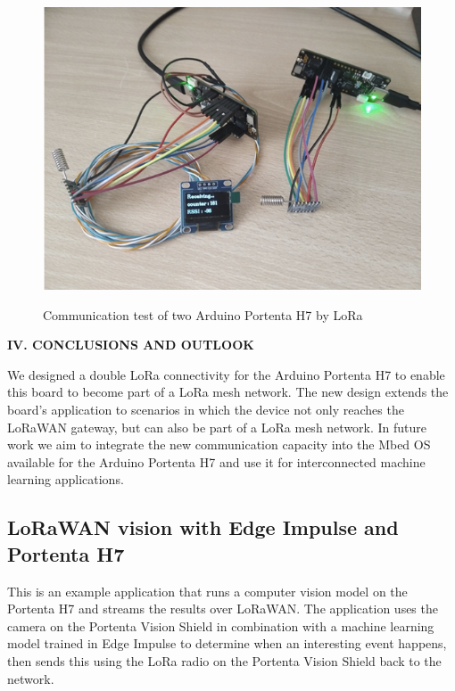 \begin{figure}
	\begin{center}
		\includegraphics[width=0.7\linewidth]{Images/LORA/LCommunication.png}
		\caption{Communication test of two Arduino Portenta H7 by LoRa}
		\label{LCommunication} \cite{PortentaLANMAN2022}
	\end{center}
\end{figure}

\textbf{IV. CONCLUSIONS AND OUTLOOK} \newline

We designed a double LoRa connectivity for the Arduino
Portenta H7 to enable this board to become part of a LoRa mesh
network. The new design extends the board’s application to
scenarios in which the device not only reaches the LoRaWAN
gateway, but can also be part of a LoRa mesh network.
In future work we aim to integrate the new communication
capacity into the Mbed OS available for the Arduino Portenta
H7 and use it for interconnected machine learning applications. \cite{PortentaLANMAN2022} \newpage




\subsection{LoRaWAN vision with Edge Impulse and Portenta H7}

This is an example application that runs a computer vision model on the Portenta H7 and streams the results over LoRaWAN. The application uses the camera on the Portenta Vision Shield in combination with a machine learning model trained in Edge Impulse to determine when an interesting event happens, then sends this using the LoRa radio on the Portenta Vision Shield back to the network. \cite{edge_impulse_portenta_lorawan:2025} \newline 


